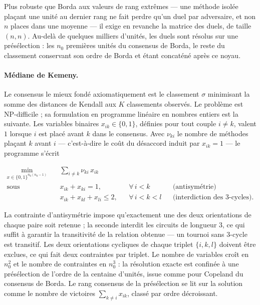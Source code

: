 \documentclass[11pt,a4paper]{article}
\theoremstyle{definition}
\theoremstyle{remark}
\begin{document}
\bigskip

Plus robuste que Borda aux valeurs de rang extrêmes --- une méthode isolée plaçant une unité
au dernier rang ne fait perdre qu'un duel par adversaire, et non $n$ places dans une
moyenne --- il exige en revanche la matrice des duels, de taille $(n,n)$. Au-delà de
quelques milliers d'unités, les duels sont résolus sur une présélection : les $n_0$
premières unités du consensus de Borda, le reste du classement conservant son ordre de
Borda et étant concaténé après ce noyau.

\bigskip

\paragraph{Médiane de Kemeny.} Le consensus le mieux fondé axiomatiquement
\citep{kemeny1959} est le classement $\sigma$ minimisant la somme des distances de Kendall
aux $K$ classements observés. Le problème est NP-difficile \citep{dwork2001} ; sa
formulation en programme linéaire en nombres entiers est la suivante. Les variables
binaires $x_{ik} \in \{0,1\}$, définies pour tout couple $i \ne k$, valent $1$ lorsque $i$
est placé avant $k$ dans le consensus. Avec $\nu_{ki}$ le nombre de méthodes plaçant $k$
avant $i$ --- c'est-à-dire le coût du désaccord induit par $x_{ik} = 1$ --- le programme
s'écrit

\medskip

\begin{align*}
  \min_{x \in \{0,1\}^{n_0(n_0-1)}} \quad & \sum_{i \ne k} \nu_{ki}\, x_{ik} \\[0.2em]
  \text{sous} \quad & x_{ik} + x_{ki} = 1,
    && \forall\, i < k
    && \text{(antisymétrie)} \\[0.2em]
  & x_{ik} + x_{kl} + x_{li} \le 2,
    && \forall\, i < k < l
    && \text{(interdiction des $3$-cycles)} .
\end{align*}

\bigskip

La contrainte d'antisymétrie impose qu'exactement une des deux orientations de chaque paire
soit retenue ; la seconde interdit les circuits de longueur $3$, ce qui suffit à garantir la
transitivité de la relation obtenue --- un tournoi sans $3$-cycle est transitif. Les deux
orientations cycliques de chaque triplet $\{i,k,l\}$ doivent être exclues, ce qui fait deux
contraintes par triplet. Le nombre de variables croît en $n_0^2$ et le nombre de contraintes
en $n_0^3$ : la résolution exacte est confinée à une présélection de l'ordre de la centaine
d'unités, issue comme pour Copeland du consensus de Borda. Le rang consensus de la
présélection se lit sur la solution comme le nombre de victoires
$\sum_{k \ne i} x_{ik}$, classé par ordre décroissant.
\end{document}
